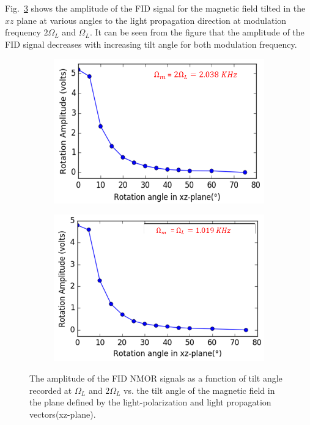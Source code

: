 Fig.~\ref{fig:tilted-wrong} shows the amplitude of the FID signal for the magnetic field tilted in the $xz$ plane at various angles to the light propagation direction at modulation frequency $2\Omega_L$ and $\Omega_L$. It can be seen from the figure that the amplitude of the FID signal decreases with increasing tilt angle for both modulation frequency. 

\begin{figure}
    \centering
   \begin{subfigure}[b]{0.45\textwidth}
        \centering
        \includegraphics[width=\textwidth]{figures/tilt_x_larmor.png}
        \caption{}
        \label{fig:y equals x}
    \end{subfigure}
    \hfill
     \begin{subfigure}[b]{0.45\textwidth}
        \centering
        \includegraphics[width=\textwidth]{figures/tilt_x_2larmor.png}
        \caption{}
        \label{fig:three sin x}
    \end{subfigure}
    \caption{ The amplitude of the FID NMOR signals as a function
      of tilt angle recorded at $\Omega_L$ and $2\Omega_L$ vs. the
      tilt angle of the magnetic field in the plane defined by the
      light-polarization and light propagation vectors(xz-plane). \label{fig:tilted-wrong}}
\end{figure}

